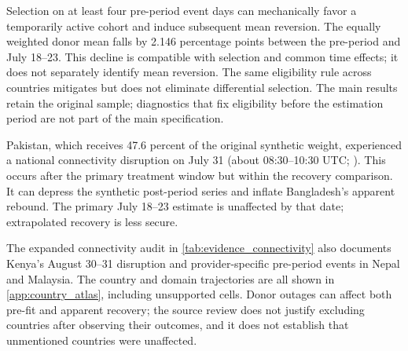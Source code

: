 Selection on at least four pre-period event days can mechanically favor a temporarily active cohort and induce subsequent mean reversion. The equally weighted donor mean falls by 2.146 percentage points between the pre-period and July 18--23. This decline is compatible with selection and common time effects; it does not separately identify mean reversion. The same eligibility rule across countries mitigates but does not eliminate differential selection. The main results retain the original sample; diagnostics that fix eligibility before the estimation period are not part of the main specification.


Pakistan, which receives 47.6 percent of the original synthetic weight, experienced a national connectivity disruption on July 31 (about 08:30--10:30 UTC; \citealp{belson2024}). This occurs after the primary treatment window but within the recovery comparison. It can depress the synthetic post-period series and inflate Bangladesh's apparent rebound. The primary July 18--23 estimate is unaffected by that date; extrapolated recovery is less secure.

The expanded connectivity audit in \cref{tab:evidence_connectivity} also documents Kenya's August 30--31 disruption and provider-specific pre-period events in Nepal and Malaysia. The country and domain trajectories are all shown in \cref{app:country_atlas}, including unsupported cells. Donor outages can affect both pre-fit and apparent recovery; the source review does not justify excluding countries after observing their outcomes, and it does not establish that unmentioned countries were unaffected.
